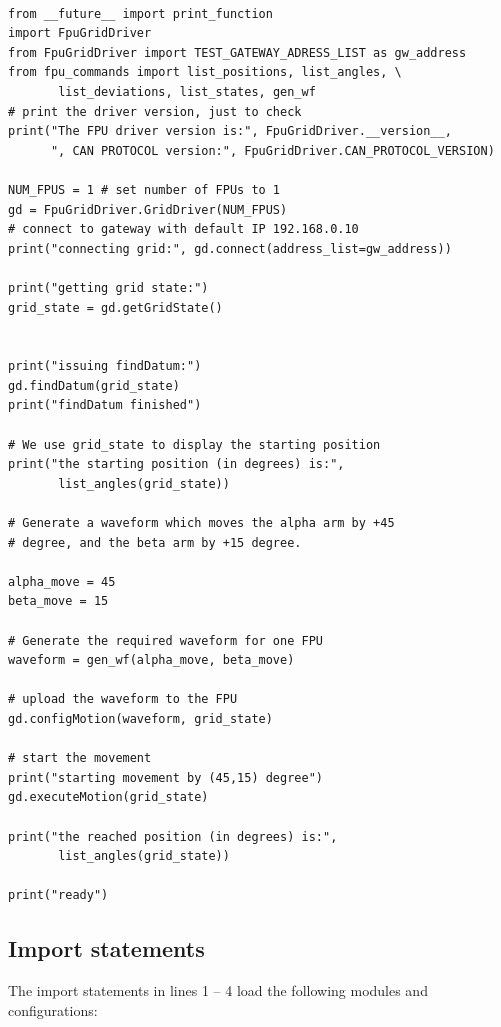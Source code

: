 \documentclass[11pt,a4paper]{report}
\begin{document}
\begin{verbatim}

from __future__ import print_function
import FpuGridDriver
from FpuGridDriver import TEST_GATEWAY_ADRESS_LIST as gw_address
from fpu_commands import list_positions, list_angles, \
       list_deviations, list_states, gen_wf
# print the driver version, just to check
print("The FPU driver version is:", FpuGridDriver.__version__,
      ", CAN PROTOCOL version:", FpuGridDriver.CAN_PROTOCOL_VERSION)

NUM_FPUS = 1 # set number of FPUs to 1
gd = FpuGridDriver.GridDriver(NUM_FPUS)
# connect to gateway with default IP 192.168.0.10
print("connecting grid:", gd.connect(address_list=gw_address))

print("getting grid state:")
grid_state = gd.getGridState()


print("issuing findDatum:")
gd.findDatum(grid_state)
print("findDatum finished")

# We use grid_state to display the starting position
print("the starting position (in degrees) is:",
       list_angles(grid_state))

# Generate a waveform which moves the alpha arm by +45
# degree, and the beta arm by +15 degree. 

alpha_move = 45
beta_move = 15

# Generate the required waveform for one FPU
waveform = gen_wf(alpha_move, beta_move)

# upload the waveform to the FPU
gd.configMotion(waveform, grid_state)

# start the movement
print("starting movement by (45,15) degree")
gd.executeMotion(grid_state)

print("the reached position (in degrees) is:",
       list_angles(grid_state))

print("ready")

\end{verbatim}


\subsection{Import statements}

The import statements in lines 1 -- 4 load the following modules and
configurations:
\end{document}
